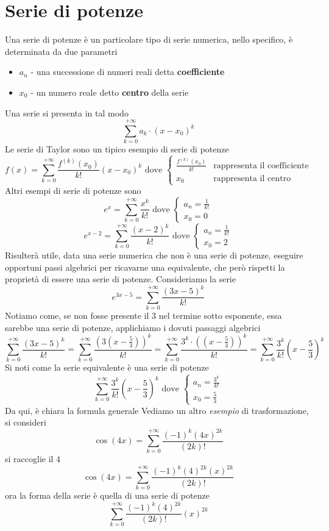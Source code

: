 \documentclass[10pt, letterpaper]{report}
\begin{document}
\section{Serie di potenze}
Una serie di potenze è un particolare tipo di serie numerica, nello specifico,
è determinata da due parametri\begin{itemize}
    \item $a_n$ - una successione di numeri reali detta \textbf{coefficiente}
    \item $x_0$ - un numero reale detto \textbf{centro} della serie
\end{itemize}
Una serie si presenta in tal modo $$
    \sum_{k=0}^{+\infty}a_k\cdot(x-x_0)^k
$$
Le serie di Taylor sono un tipico esempio di serie di potenze
$$
    f(x)=\displaystyle \sum_{k=0}^{+\infty}\dfrac{f^{(k)}(x_0)}{k!}(x-x_0)^k \text{ dove }
    \begin{cases}
        \frac{f^{(k)}(x_0)}{k!} & \text{rappresenta il coefficiente } \\
        x_0                     & \text{rappresenta il centro }
    \end{cases}
$$
Altri esempi di serie di potenze sono
$$
    e^x=\displaystyle \sum_{k=0}^{+\infty}\dfrac{x^k}{k!} \text{ dove } \begin{cases}
        a_n = \frac{1}{k!} \\
        x_0 = 0
    \end{cases}
$$
$$
    e^{x-2}=\displaystyle \sum_{k=0}^{+\infty}\dfrac{(x-2)^k}{k!} \text{ dove } \begin{cases}
        a_n = \frac{1}{k!} \\
        x_0 = 2
    \end{cases}
$$
Risulterà utile, data una serie numerica che non è una serie di potenze, eseguire opportuni
passi algebrici per ricavarne una equivalente, che però rispetti la proprietà di essere una
serie di potenze.\acc
Consideriamo la serie
$$ e^{3x-5}=\displaystyle \sum_{k=0}^{+\infty}\frac{(3x-5)^k}{k!}  $$
Notiamo come, se non fosse presente il $3$ nel termine sotto esponente, essa sarebbe una serie di potenze,
applichiamo i dovuti passaggi algebrici
$$\sum_{k=0}^{+\infty}\frac{(3x-5)^k}{k!} =\sum_{k=0}^{+\infty}\frac{(3(x-\frac{5}{3}))^k}{k!}
    =\sum_{k=0}^{+\infty}\frac{3^k\cdot ((x-\frac{5}{3}))^k}{k!} =
    \sum_{k=0}^{+\infty}\frac{3^k}{k!}(x-\frac{5}{3})^k$$
Si noti come la serie equivalente è una serie di potenze
$$
    \displaystyle \sum_{k=0}^{+\infty}\frac{3^k}{k!}(x-\frac{5}{3})^k  \text{ dove } \begin{cases}
        a_n = \frac{3^k}{k!} \\
        x_0 = \frac{5}{3}
    \end{cases}
$$
Da qui, è chiara la formula generale
Vediamo un altro \textit{esempio} di trasformazione, si consideri
$$ \cos(4x) = \sum_{k=0}^{+\infty}\frac{(-1)^k(4x)^{2k}}{(2k)!}$$
si raccoglie il $4$
$$  \cos(4x) =\sum_{k=0}^{+\infty}\frac{(-1)^k(4)^{2k}(x)^{2k}}{(2k)!}$$
ora la forma della serie è quella di una serie di potenze
$$ \sum_{k=0}^{+\infty}\frac{(-1)^k(4)^{2k}}{(2k)!}(x)^{2k}$$
\end{document}
